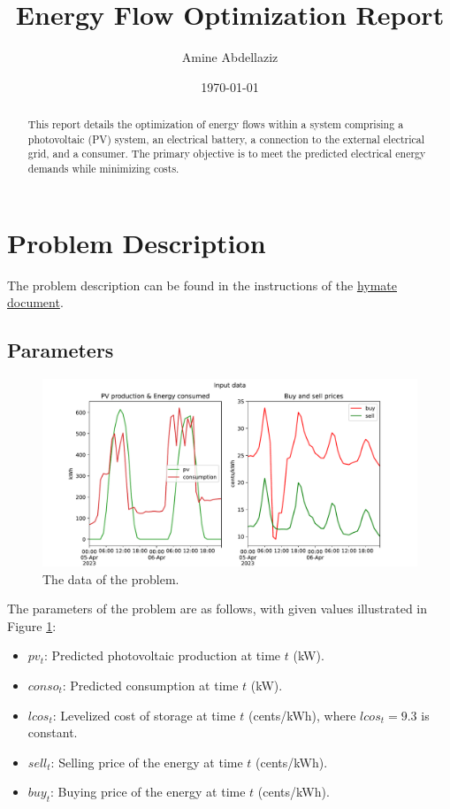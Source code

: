 \documentclass[12pt]{article}
\title{Energy Flow Optimization Report}
\author{Amine Abdellaziz}
\date{\today}
\begin{document}
\maketitle

\begin{abstract}
This report details the optimization of energy flows within a system comprising a photovoltaic (PV) system, an electrical battery, a connection to the external electrical grid, and a consumer. The primary objective is to meet the predicted electrical energy demands while minimizing costs.
\end{abstract}

\section{Problem Description}
The problem description can be found in the instructions of the \href{https://github.com/mathaziz/energy_flow_optimization/blob/main/instructions_hymate.pdf}{hymate document}.

\subsection{Parameters}
\begin{figure}[h]
    \centering
    \includegraphics[width=\textwidth]{input_data}
    \caption{The data of the problem.}
    \label{fig:data}
\end{figure}

The parameters of the problem are as follows, with given values illustrated in Figure \ref{fig:data}:
\begin{itemize}
    \item \(pv_t\): Predicted photovoltaic production at time \(t\) (kW).
    \item \(conso_t\): Predicted consumption at time \(t\) (kW).
    \item \(lcos_t\): Levelized cost of storage at time \(t\) (cents/kWh), where \(lcos_t = 9.3\) is constant.
    \item \(sell_t\): Selling price of the energy at time \(t\) (cents/kWh).
    \item \(buy_t\): Buying price of the energy at time \(t\) (cents/kWh).
\end{itemize}
\end{document}
